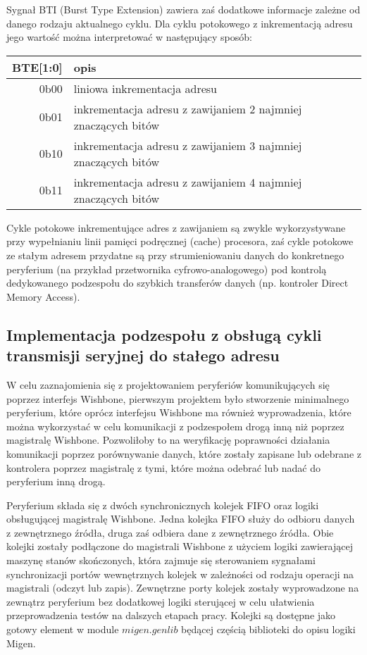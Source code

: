 Sygnał BTI (Burst Type Extension) zawiera zaś dodatkowe informacje zależne od danego rodzaju aktualnego cyklu.
Dla cyklu potokowego z inkrementacją adresu jego wartość można interpretować w następujący sposób:

\begin{center}
\begin{tabular}{ r|l }
 BTE[1:0] & opis \\ 
 \hline
 0b00 & liniowa inkrementacja adresu \\
 0b01 & inkrementacja adresu z zawijaniem 2 najmniej znaczących bitów \\
 0b10 & inkrementacja adresu z zawijaniem 3 najmniej znaczących bitów \\
 0b11 & inkrementacja adresu z zawijaniem 4 najmniej znaczących bitów \\
 \hline
\end{tabular}
\end{center}

Cykle potokowe inkrementujące adres z zawijaniem są zwykle wykorzystywane przy wypełnianiu linii pamięci podręcznej (cache) procesora, zaś cykle potokowe ze stałym adresem przydatne są przy strumieniowaniu danych do konkretnego peryferium (na przykład przetwornika cyfrowo-analogowego) pod kontrolą dedykowanego podzespołu do szybkich transferów danych (np. kontroler Direct Memory Access).

\subsection{Implementacja podzespołu z obsługą cykli transmisji seryjnej do stałego adresu}

W celu zaznajomienia się z projektowaniem peryferiów komunikujących się poprzez interfejs Wishbone, pierwszym projektem było stworzenie minimalnego peryferium, które oprócz interfejsu Wishbone ma również wyprowadzenia, które można wykorzystać w celu komunikacji z podzespołem drogą inną niż poprzez magistralę Wishbone. Pozwoliłoby to na weryfikację poprawności działania komunikacji poprzez porównywanie danych, które zostały zapisane lub odebrane z kontrolera poprzez magistralę z tymi, które można odebrać lub nadać do peryferium inną drogą.


Peryferium składa się z dwóch synchronicznych kolejek FIFO oraz logiki obsługującej magistralę Wishbone. Jedna kolejka FIFO służy do odbioru danych z zewnętrznego źródła, druga zaś odbiera dane z zewnętrznego źródła. Obie kolejki zostały podłączone do magistrali Wishbone z użyciem logiki zawierającej maszynę stanów skończonych, która zajmuje się sterowaniem sygnałami synchronizacji portów wewnętrznych kolejek w zależności od rodzaju operacji na magistrali (odczyt lub zapis). Zewnętrzne porty kolejek zostały wyprowadzone na zewnątrz peryferium bez dodatkowej logiki sterującej w celu ułatwienia przeprowadzenia testów na dalszych etapach pracy. Kolejki są dostępne jako gotowy element w module $migen.genlib$ będącej częścią biblioteki do opisu logiki Migen.

